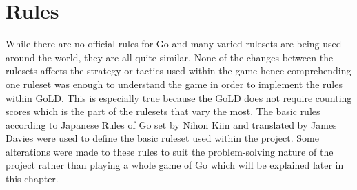 \documentclass{l4proj}
\begin{document}
\section{Rules}

While there are no official rules for Go and many varied rulesets are being used around the world, they are all quite similar. None of the changes between the rulesets affects the strategy or tactics used within the game hence comprehending one ruleset was enough to understand the game in order to implement the rules within GoLD. This is especially true because the GoLD does not require counting scores which is the part of the rulesets that vary the most. The basic rules according to Japanese Rules of Go set by Nihon Kiin and translated by James Davies \cite{NihonKiinRules} were used to define the basic ruleset used within the project. Some alterations were made to these rules to suit the problem-solving nature of the project rather than playing a whole game of Go which will be explained later in this chapter.
\end{document}
